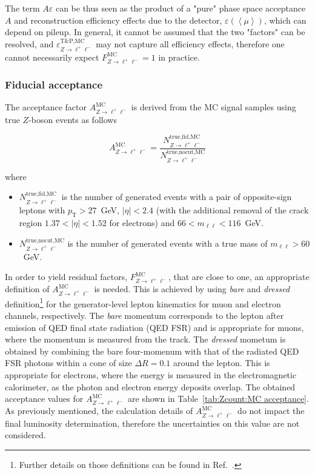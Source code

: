 The term $A\varepsilon$ can be thus seen as the product of a "pure" phase space acceptance $A$ and reconstruction efficiency effects due to the detector, $\varepsilon(\left< \mu \right>)$, which can depend on pileup. In general, it cannot be assumed that the two "factors" can be resolved, and $\varepsilon^\text{T\&P,MC}_{Z\rightarrow \ell^+\ell^-}$ may not capture all efficiency effects, therefore one cannot necessarily expect $F^\text{MC}_{Z\rightarrow \ell^+\ell^-}=1$ in practice.

\subsubsection{Fiducial acceptance}
\label{sec:Zcount:acceptance MC}

The acceptance factor $A^\text{MC}_{Z\rightarrow \ell^+\ell^-}$ is derived from the MC signal samples using true $Z$-boson events as follows

\begin{equation}
A^\text{MC}_{Z\rightarrow \ell^+\ell^-} =  \frac{N^\text{true,fid,MC}_{Z\rightarrow \ell^+\ell^-}}{N^\text{true,nocut,MC}_{Z\rightarrow \ell^+\ell^-}}
\end{equation}

where

\begin{itemize}
	\item $N^\text{true,fid,MC}_{Z\rightarrow \ell^+\ell^-}$ is the number of generated events with a pair of opposite-sign leptons with $p_\text{T}>27$~GeV, $|\eta|<2.4$ (with the additional removal of the crack region $1.37<|\eta|<1.52$ for electrons) and $66<m_{\ell\ell}<116$~GeV.
	\item $N^\text{true,nocut,MC}_{Z\rightarrow \ell^+\ell^-}$ is the number of generated events with a true mass of $m_{\ell\ell}>60$~GeV.
\end{itemize}

In order to yield residual factors, $F^\text{MC}_{Z\rightarrow \ell^+\ell^-}$, that are close to one, an appropriate definition of $A^\text{MC}_{Z\rightarrow \ell^+\ell^-}$ is needed. This is achieved by using \textit{bare} and \textit{dressed} definition\footnote{Further details on those definitions can be found in Ref.~\cite{ATLAS:2019zci}.} for the generator-level lepton kinematics for muon and electron channels, respectively. The \textit{bare} momentum corresponds to the lepton after emission of QED final state radiation (QED FSR) and is appropriate for muons, where the momentum is measured from the track. The \textit{dressed} mometum is obtained by combining the bare four-momenum with that of the radiated QED FSR photons within a cone of size $\Delta R =0.1$ around the lepton. This is appropriate for electrons, where the energy is measured in the electromagnetic calorimeter, as the photon and electron energy deposits overlap. The obtained acceptance values for $A^\text{MC}_{Z\rightarrow \ell^+\ell^-}$ are shown in Table~\ref{tab:Zcount:MC acceptance}. As previously mentioned, the calculation details of $A^\text{MC}_{Z\rightarrow \ell^+\ell^-}$ do not impact the final luminosity determination, therefore the uncertainties on this value are not considered.

